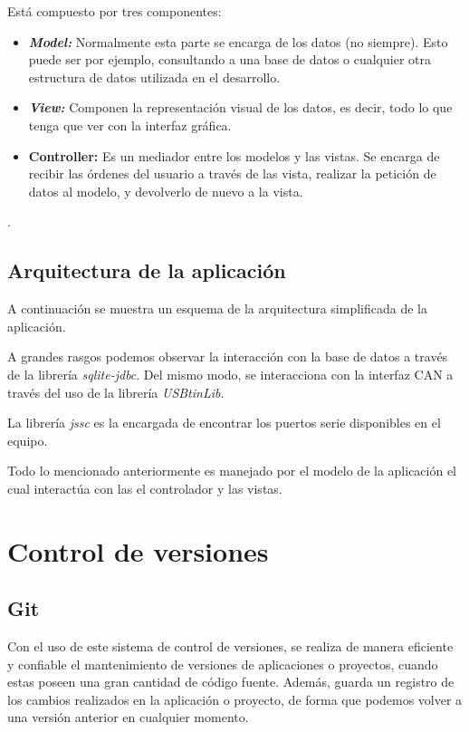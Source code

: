 Está compuesto por tres componentes:
\begin{itemize}
\item
\textit{\textbf{Model: }} Normalmente esta parte se encarga de los datos (no siempre). Esto puede ser por ejemplo, consultando a una base de datos o cualquier otra estructura de datos utilizada en el desarrollo.
\item
\textit{\textbf{View: }} Componen la representación visual de los datos, es decir, todo lo que tenga que ver con la interfaz gráfica.
\item
\textbf{\textbf{Controller: }} Es un mediador entre los modelos y las vistas. Se encarga de recibir las órdenes del usuario a través de las vista, realizar la petición de datos al modelo, y devolverlo de nuevo a la vista.
\end{itemize}

.
\newpage
\subsection{Arquitectura de la aplicación}\label{arquitectura_app}

A continuación se muestra un esquema de la arquitectura simplificada de la aplicación.


A grandes rasgos podemos observar la interacción con la base de datos a través de la librería \emph{sqlite-jdbc}. Del mismo modo, se interacciona con la interfaz CAN a través del uso de la librería \emph{USBtinLib}.

La librería \emph{jssc} es la encargada de encontrar los puertos serie disponibles en el equipo.

Todo lo mencionado anteriormente es manejado por el modelo de la aplicación el cual interactúa con las el controlador y las vistas.

\section{Control de versiones}\label{control_de_versiones}

\subsection{Git}\label{git}

Con el uso de este sistema de control de versiones, se realiza de manera eficiente y confiable el mantenimiento de versiones de aplicaciones o proyectos, cuando estas poseen una gran cantidad de código fuente. Además, guarda un registro de los cambios realizados en la aplicación o proyecto, de forma que podemos volver a una versión anterior en cualquier momento.

